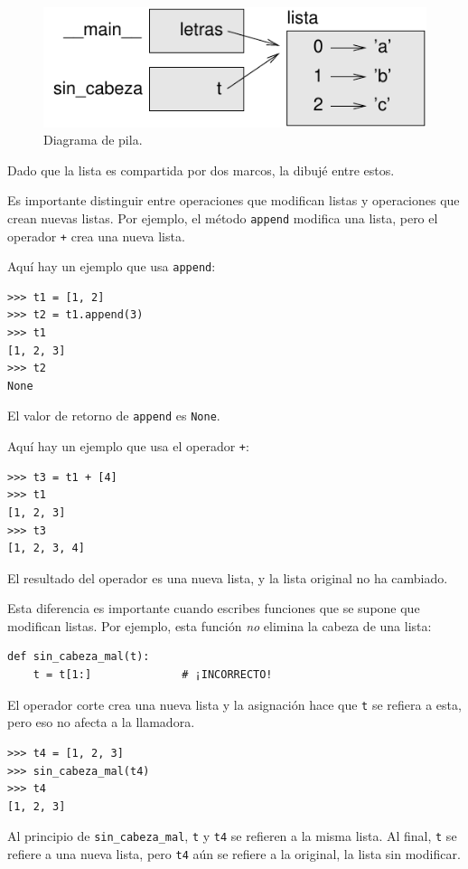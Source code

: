 \documentclass[10pt]{book}
\begin{document}
\begin{figure}
\centerline
{\includegraphics[scale=0.8]{figs/stack5.pdf}}
\caption{Diagrama de pila.}
\label{fig.stack5}
\end{figure}

Dado que la lista es compartida por dos marcos, la dibujé
entre estos.

Es importante distinguir entre operaciones que
modifican listas y operaciones que crean nuevas listas.  Por
ejemplo, el método {\tt append} modifica una lista, pero el
operador {\tt +} crea una nueva lista.

Aquí hay un ejemplo que usa {\tt append}:
%
\begin{verbatim}
>>> t1 = [1, 2]
>>> t2 = t1.append(3)
>>> t1
[1, 2, 3]
>>> t2
None
\end{verbatim}
%
El valor de retorno de {\tt append} es {\tt None}.

Aquí hay un ejemplo que usa el operador {\tt +}:
%
\begin{verbatim}
>>> t3 = t1 + [4]
>>> t1
[1, 2, 3]
>>> t3
[1, 2, 3, 4]
\end{verbatim}
%
El resultado del operador es una nueva lista, y la lista original no ha
cambiado.

Esta diferencia es importante cuando escribes funciones que
se supone que modifican listas.  Por ejemplo, esta función
{\em no} elimina la cabeza de una lista:
%
\begin{verbatim}
def sin_cabeza_mal(t):
    t = t[1:]              # ¡INCORRECTO!
\end{verbatim}
%
El operador corte crea una nueva lista y la asignación
hace que {\tt t} se refiera a esta, pero eso no afecta a la llamadora.
%
\begin{verbatim}
>>> t4 = [1, 2, 3]
>>> sin_cabeza_mal(t4)
>>> t4
[1, 2, 3]
\end{verbatim}
%
Al principio de \verb"sin_cabeza_mal", {\tt t} y {\tt t4}
se refieren a la misma lista.  Al final, {\tt t} se refiere a una nueva lista,
pero {\tt t4} aún se refiere a la original, la lista sin modificar.
\end{document}
